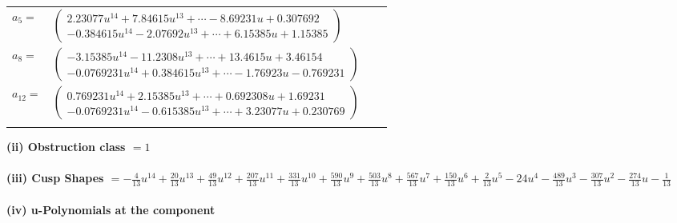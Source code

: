 \documentclass[1p]{elsarticle_modified}
\theoremstyle{definition}
\begin{document}
\begin{tabular}{m{7pt} m{180pt} m{7pt} m{180pt} }
\flushright $a_{5}=$&$\begin{pmatrix}2.23077 u^{14}+7.84615 u^{13}+\cdots-8.69231 u+0.307692\\-0.384615 u^{14}-2.07692 u^{13}+\cdots+6.15385 u+1.15385\end{pmatrix}$ \\
\flushright $a_{8}=$&$\begin{pmatrix}-3.15385 u^{14}-11.2308 u^{13}+\cdots+13.4615 u+3.46154\\-0.0769231 u^{14}+0.384615 u^{13}+\cdots-1.76923 u-0.769231\end{pmatrix}$ \\
\flushright $a_{12}=$&$\begin{pmatrix}0.769231 u^{14}+2.15385 u^{13}+\cdots+0.692308 u+1.69231\\-0.0769231 u^{14}-0.615385 u^{13}+\cdots+3.23077 u+0.230769\end{pmatrix}$\\&\end{tabular}
\flushleft \textbf{(ii) Obstruction class $= 1$}\\~\\
\flushleft \textbf{(iii) Cusp Shapes $= -\frac{4}{13} u^{14}+\frac{20}{13} u^{13}+\frac{49}{13} u^{12}+\frac{207}{13} u^{11}+\frac{331}{13} u^{10}+\frac{590}{13} u^9+\frac{503}{13} u^8+\frac{567}{13} u^7+\frac{150}{13} u^6+\frac{2}{13} u^5-24 u^4-\frac{489}{13} u^3-\frac{307}{13} u^2-\frac{274}{13} u-\frac{1}{13}$}\\~\\
\newpage\renewcommand{\arraystretch}{1}
\flushleft \textbf{(iv) u-Polynomials at the component}\newline \\
\end{document}
